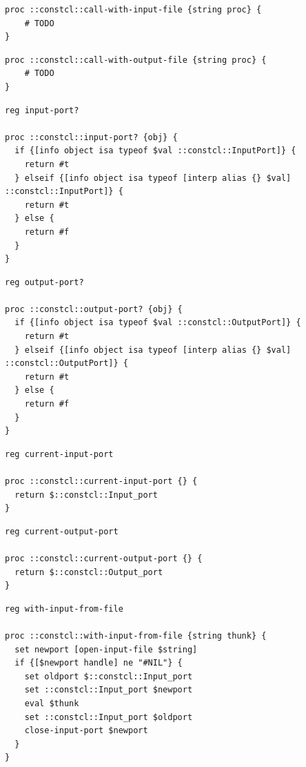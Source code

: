 \documentclass[twoside,9pt]{report}
\begin{document}
\noindent\makebox[\linewidth]{\rule{\linewidth}{0.4pt}}
\noindent\makebox[\linewidth]{\rule{\linewidth}{0.4pt}}
\begin{lstlisting}
proc ::constcl::call-with-input-file {string proc} {
    # TODO
}
\end{lstlisting}
\noindent\makebox[\linewidth]{\rule{\linewidth}{0.4pt}}
\noindent\makebox[\linewidth]{\rule{\linewidth}{0.4pt}}
\begin{lstlisting}
proc ::constcl::call-with-output-file {string proc} {
    # TODO
}
\end{lstlisting}
\noindent\makebox[\linewidth]{\rule{\linewidth}{0.4pt}}
\noindent\makebox[\linewidth]{\rule{\linewidth}{0.4pt}}
\begin{lstlisting}
reg input-port?
 
proc ::constcl::input-port? {obj} {
  if {[info object isa typeof $val ::constcl::InputPort]} {
    return #t
  } elseif {[info object isa typeof [interp alias {} $val] ::constcl::InputPort]} {
    return #t
  } else {
    return #f
  }
}
\end{lstlisting}
\noindent\makebox[\linewidth]{\rule{\linewidth}{0.4pt}}
\noindent\makebox[\linewidth]{\rule{\linewidth}{0.4pt}}
\begin{lstlisting}
reg output-port?
 
proc ::constcl::output-port? {obj} {
  if {[info object isa typeof $val ::constcl::OutputPort]} {
    return #t
  } elseif {[info object isa typeof [interp alias {} $val] ::constcl::OutputPort]} {
    return #t
  } else {
    return #f
  }
}
\end{lstlisting}
\noindent\makebox[\linewidth]{\rule{\linewidth}{0.4pt}}
\noindent\makebox[\linewidth]{\rule{\linewidth}{0.4pt}}
\begin{lstlisting}
reg current-input-port
 
proc ::constcl::current-input-port {} {
  return $::constcl::Input_port
}
\end{lstlisting}
\noindent\makebox[\linewidth]{\rule{\linewidth}{0.4pt}}
\noindent\makebox[\linewidth]{\rule{\linewidth}{0.4pt}}
\begin{lstlisting}
reg current-output-port
 
proc ::constcl::current-output-port {} {
  return $::constcl::Output_port
}
\end{lstlisting}
\noindent\makebox[\linewidth]{\rule{\linewidth}{0.4pt}}
\noindent\makebox[\linewidth]{\rule{\linewidth}{0.4pt}}
\begin{lstlisting}
reg with-input-from-file
 
proc ::constcl::with-input-from-file {string thunk} {
  set newport [open-input-file $string]
  if {[$newport handle] ne "#NIL"} {
    set oldport $::constcl::Input_port
    set ::constcl::Input_port $newport
    eval $thunk
    set ::constcl::Input_port $oldport
    close-input-port $newport
  }
}
\end{lstlisting}
\end{document}

